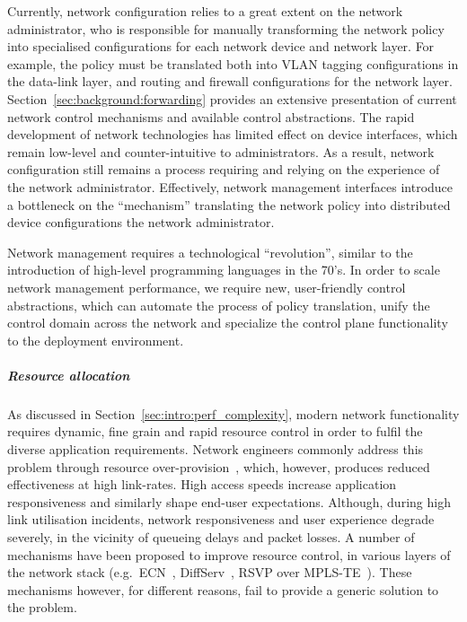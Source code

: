 Currently, network configuration relies to a great extent on the network
administrator, who is responsible for manually transforming the network policy into
specialised configurations for each network device and network layer.  For
example, the policy must be translated both into VLAN tagging configurations in
the data-link layer, and routing and firewall configurations for the network
layer.  Section~\ref{sec:background:forwarding} provides an extensive
presentation of current network control mechanisms and available control
abstractions.  The rapid development of network technologies has limited
effect on device interfaces, which remain low-level and counter-intuitive to
administrators. As a result, network configuration still remains a process
requiring and relying on the experience of the network administrator.  Effectively,
network management interfaces introduce a bottleneck on the ``mechanism''
translating the network policy into distributed device configurations the
network administrator.  

Network management requires a technological ``revolution'', similar to the
introduction of high-level programming languages in the 70's.  In order to
scale network management performance, we require new, user-friendly control
abstractions, which can automate the process of policy translation, unify the
control domain across the network and specialize the control plane
functionality to the deployment environment. 

\subparagraph*{Resource allocation} 

As discussed in Section~\ref{sec:intro:perf_complexity}, modern network
functionality requires dynamic, fine grain and rapid resource control in order
to fulfil the diverse application requirements.  Network engineers commonly
address this problem through resource over-provision~, which,
however, produces reduced effectiveness at high link-rates. High access speeds
increase application responsiveness and similarly shape end-user
expectations.  Although, during high link utilisation incidents, network
responsiveness and user experience degrade severely, in the vicinity of
queueing delays and packet losses.  A number of mechanisms have been proposed to
improve resource control, in various layers of the network stack
(e.g.~ECN~, DiffServ~, RSVP over
MPLS-TE~). These mechanisms however, for different reasons,  fail to
provide a generic solution to the problem. 

